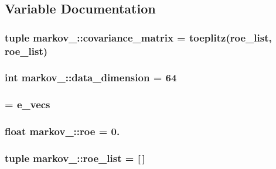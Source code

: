 \subsection{\-Variable \-Documentation}
\hypertarget{namespacemarkov__1_a7cc4d10a876ec07da21dbfd4d28e8684}{
\subsubsection[{covariance\-\_\-matrix}]{\setlength{\rightskip}{0pt plus 5cm}tuple {\bf markov\-\_\-::covariance\-\_\-matrix} = toeplitz({\bf roe\-\_\-list}, {\bf roe\-\_\-list})}}\label{namespacemarkov__1_a7cc4d10a876ec07da21dbfd4d28e8684}
\hypertarget{namespacemarkov__1_a8134563a0c42390906c8914ad337e9d8}{
\subsubsection[{data\-\_\-dimension}]{\setlength{\rightskip}{0pt plus 5cm}int {\bf markov\-\_\-::data\-\_\-dimension} = 64}}\label{namespacemarkov__1_a8134563a0c42390906c8914ad337e9d8}
\hypertarget{namespacemarkov__1_a3744683663f02bff5cf245a674ab9b32}{
\subsubsection[{\-Data\-Out}]{ = e\-\_\-vecs}}\label{namespacemarkov__1_a3744683663f02bff5cf245a674ab9b32}
\hypertarget{namespacemarkov__1_a4a3eda3678257ab2cf6f06891c5ec22c}{
\subsubsection[{roe}]{\setlength{\rightskip}{0pt plus 5cm}float {\bf markov\-\_\-::roe} = 0.}}\label{namespacemarkov__1_a4a3eda3678257ab2cf6f06891c5ec22c}
\hypertarget{namespacemarkov__1_ac6e549cf6d4d6df355d884b67fb19851}{
\subsubsection[{roe\-\_\-list}]{\setlength{\rightskip}{0pt plus 5cm}tuple {\bf markov\-\_\-::roe\-\_\-list} = \mbox{[}$\,$\mbox{]}}}\label{namespacemarkov__1_ac6e549cf6d4d6df355d884b67fb19851}
